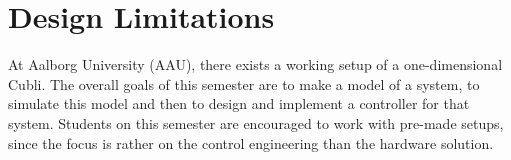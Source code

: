 \chapter{Design Limitations}

At Aalborg University (AAU), there exists a working setup of a one-dimensional Cubli. The overall goals of this semester are to make a model of a system, to simulate this model and then to design and implement a controller for that system. Students on this semester are encouraged to work with pre-made setups, since the focus is rather on the control engineering than the hardware solution.

